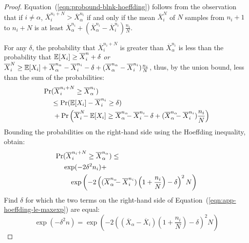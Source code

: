 \begin{proof}
	Equation~(\ref{eqn:probound-blnk-hoeffding}) follows from the
	observation that if $i\ne\alpha$, $\overline X_i^{n_i+N}>\overline X_\alpha^{n_i}$
	if and only if the mean $\overline X_i^N$ of $N$ samples from $n_i+1$
	to $n_i+N$ is at least $\overline X_\alpha^{n_i}+(\overline X_\alpha^{n_i}-\overline
	X_i^{n_i})\frac {n_i} N$.

	For any $\delta$, the probability that $\overline X_i^{n_i+N}$ is greater
	than $\overline X_\alpha^{n_i}$ is less than the probability that
	$\mathbb{E}[X_i]\ge\overline X_i^n+\delta$
	\emph{or} $\overline X_i^N\ge \mathbb{E}[X_i]+\overline X_\alpha^{n_\alpha}
	- \overline X_i^{n_i} - \delta +(\overline X_\alpha^{n_\alpha} - \overline X_i^{n_i})\frac {n_i} N$,
	thus, by the union bound, less than the sum of the probabilities:
	\begin{align}
	\Pr&(\overline X_i^{n_i+N}\ge \overline X_\alpha^{n_i})\nonumber\\
	   &\le\Pr(\mathbb{E}[X_i]-\overline X_i^{n_i} \ge \delta)\\
	   &\hspace{0.25em}+\Pr\left(\overline X_i^N\hspace{-0.5em} - \mathbb{E}[X_i] \ge \overline X_\alpha^{n_\alpha}\hspace{-0.5em}
	           - \overline X_i^{n_i}\hspace{-0.5em} - \delta +(\overline X_\alpha^{n_\alpha}\hspace{-0.5em} - \overline X_i^{n_i})\frac {n_i} N\right)\nonumber
	\end{align}
	Bounding the probabilities on the right-hand side using the Hoeffding
	inequality, obtain:
	\begin{align}
	\Pr&(\overline X_i^{n_i+N}\ge \overline X_\alpha^{n_\alpha})\le \nonumber\\
	    &\exp(-2\delta^2n_i)+\nonumber\\
	    &\quad\exp\left(-2\left((\overline X_\alpha^{n_\alpha}\hspace{-0.5em}
	         - \overline X_i^{n_i})\left(1+\frac {n_i} N\right)
	         - \delta\right)^2N\right)
	\label{eqn:app-hoeffding-le-maxexp}
	\end{align}
	Find $\delta$ for which the two terms on the right-hand side of
	Equation~(\ref{eqn:app-hoeffding-le-maxexp}) are equal:
	\begin{equation}
	\exp(-\delta^2n) = \exp\left(-2\left((\overline X_\alpha - \overline X_i)(1+\frac {n_i} N) - \delta\right)^2N\right)\label{eqn:app-hoeffding-eq-exp}

\end{equation}
\end{proof}
